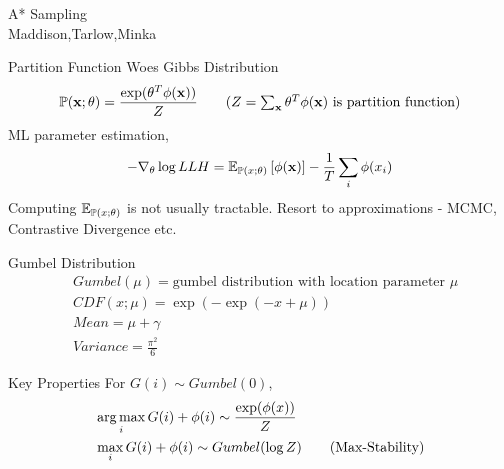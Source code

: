 \begin{frame}
  \begin{center}
    {\huge A* Sampling
    } \\
    Maddison,Tarlow,Minka
  \end{center}
\end{frame}



\begin{frame}{Partition Function Woes}
  Gibbs Distribution
  \begin{align*}
    \Pr(\x;\theta) =\frac{\exp(\theta^T\phi(\x))}{Z} \tag{$Z=\sum_{\x} \theta^T\phi(\x)$ is partition function}
  \end{align*}
  ML parameter estimation,
  \begin{align*}
    - \nabla_\theta \log LLH = \operatorname{\mathbb{E}}_{\mathbb{P}(x;\theta)}\left[\phi(\operatorname{\mathbf{x}})\right] - \frac{1}{T} \sum_i\phi(x_i)
  \end{align*}
  Computing $\operatorname{\mathbb{E}}_{\mathbb{P}(x;\theta)}$ is not usually tractable. Resort to approximations - MCMC, Contrastive Divergence etc.
\end{frame}

\begin{frame}{Gumbel Distribution}
  \begin{align*}
    & Gumbel(\mu) = \text{gumbel distribution with location parameter } \mu \\
    & CDF(x;\mu) = \exp \left(-\exp\left(-x+\mu\right)\right) \\
    & Mean = \mu+\gamma \tag{a fixed offset away from location parameter} \\
    & Variance = \frac{\pi^2}{6}
  \end{align*}
\end{frame}

\begin{frame}{Key Properties}
  For $G(i) \sim Gumbel(0)$,
  \begin{align*}
    & \operatorname*{{arg\,max}}_i{G(i)+\phi(i)} \sim \frac{\exp(\phi(x))}{Z} \\
    & \max_i{G(i)+\phi(i)} \sim Gumbel(\log Z) \tag{Max-Stability}
  \end{align*}
\end{frame}

